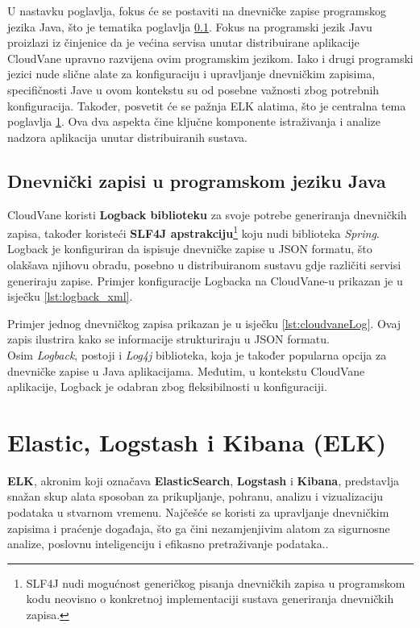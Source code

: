 \documentclass[times, utf8, diplomski]{fer}
\begin{document}
U nastavku poglavlja, fokus će se postaviti na dnevničke zapise programskog jezika Java, što je tematika poglavlja \ref{sec:java}. Fokus na programski jezik Javu proizlazi iz činjenice da je većina servisa unutar distribuirane aplikacije CloudVane upravno razvijena ovim programskim jezikom. Iako i drugi programski jezici nude slične alate za konfiguraciju i upravljanje dnevničkim zapisima, specifičnosti Jave u ovom kontekstu su od posebne važnosti zbog potrebnih konfiguracija. Također, posvetit će se pažnja ELK alatima, što je centralna tema poglavlja \ref{sec:elk}. Ova dva aspekta čine ključne komponente istraživanja i analize nadzora aplikacija unutar distribuiranih sustava.


\subsection{Dnevnički zapisi u programskom jeziku Java}
\label{sec:java}

CloudVane koristi \textbf{Logback biblioteku} za svoje potrebe generiranja dnevničkih zapisa, također koristeći \textbf{SLF4J apstrakciju}\footnote{SLF4J nudi mogućnost generičkog pisanja dnevničkih zapisa u programskom kodu neovisno o konkretnoj implementaciji sustava generiranja dnevničkih zapisa.} koju nudi biblioteka \emph{Spring}. Logback je konfiguriran da ispisuje dnevničke zapise u JSON formatu, što olakšava njihovu obradu, posebno u distribuiranom sustavu gdje različiti servisi generiraju zapise. Primjer konfiguracije Logbacka na CloudVane-u prikazan je u isječku \ref{lst:logback_xml}.

Primjer jednog dnevničkog zapisa prikazan je u isječku \ref{lst:cloudvaneLog}. Ovaj zapis ilustrira kako se informacije strukturiraju u JSON formatu.\\

Osim \emph{Logback}, postoji i \emph{Log4j} biblioteka, koja je također popularna opcija za dnevničke zapise u Java aplikacijama. Međutim, u kontekstu CloudVane aplikacije, Logback je odabran zbog fleksibilnosti u konfiguraciji.


\section{Elastic, Logstash i Kibana (ELK)}
\label{sec:elk}

\textbf{ELK}, akronim koji označava \textbf{ElasticSearch}, \textbf{Logstash} i \textbf{Kibana}, predstavlja snažan skup alata sposoban za prikupljanje, pohranu, analizu i vizualizaciju podataka u stvarnom vremenu. Najčešće se koristi za upravljanje dnevničkim zapisima i praćenje događaja, što ga čini nezamjenjivim alatom za sigurnosne analize, poslovnu inteligenciju i efikasno pretraživanje podataka.. 
\end{document}
